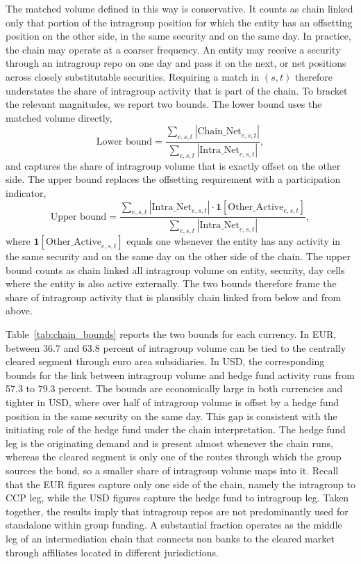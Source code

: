 \documentclass[english, 11pt, oneside, legal]{article}
\begin{document}
The matched volume defined in this way is conservative. It counts as chain linked only that portion of the intragroup position for which the entity has an offsetting position on the other side, in the same security and on the same day. In practice, the chain may operate at a coarser frequency. An entity may receive a security through an intragroup repo on one day and pass it on the next, or net positions across closely substitutable securities. Requiring a match in $(s,t)$ therefore understates the share of intragroup activity that is part of the chain. To bracket the relevant magnitudes, we report two bounds. The lower bound uses the matched volume directly,
\[
    \text{Lower bound} = \frac{\sum_{e,s,t}\left|\text{Chain\_Net}_{e,s,t}\right|}{\sum_{e,s,t}\left|\text{Intra\_Net}_{e,s,t}\right|},
\]
and captures the share of intragroup volume that is exactly offset on the other side. The upper bound replaces the offsetting requirement with a participation indicator,
\[
    \text{Upper bound} = \frac{\sum_{e,s,t}\left|\text{Intra\_Net}_{e,s,t}\right|\cdot \mathbf{1}\!\left[\text{Other\_Active}_{e,s,t}\right]}{\sum_{e,s,t}\left|\text{Intra\_Net}_{e,s,t}\right|},
\]
where $\mathbf{1}[\text{Other\_Active}_{e,s,t}]$ equals one whenever the entity has any activity in the same security and on the same day on the other side of the chain. The upper bound counts as chain linked all intragroup volume on entity, security, day cells where the entity is also active externally. The two bounds therefore frame the share of intragroup activity that is plausibly chain linked from below and from above.


Table~\ref{tab:chain_bounds} reports the two bounds for each currency. In EUR, between 36.7 and 63.8 percent of intragroup volume can be tied to the centrally cleared segment through euro area subsidiaries. In USD, the corresponding bounds for the link between intragroup volume and hedge fund activity runs from 57.3 to 79.3 percent. The bounds are economically large in both currencies and tighter in USD, where over half of intragroup volume is offset by a hedge fund position in the same security on the same day. This gap is consistent with the initiating role of the hedge fund under the chain interpretation. The hedge fund leg is the originating demand and is present almost whenever the chain runs, whereas the cleared segment is only one of the routes through which the group sources the bond, so a smaller share of intragroup volume maps into it. Recall that the EUR figures capture only one side of the chain, namely the intragroup to CCP leg, while the USD figures capture the hedge fund to intragroup leg. Taken together, the results imply that intragroup repos are not predominantly used for standalone within group funding. A substantial fraction operates as the middle leg of an intermediation chain that connects non banks to the cleared market through affiliates located in different jurisdictions.
\end{document}
